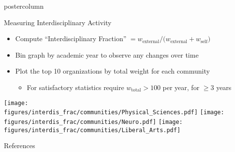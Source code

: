 \documentclass{beamer}
\newcommand{\includedir}{../latex_files}
\newcommand{\figures}{../outputs/plots}
\newlength{\columnheight}
\begin{document}
\begin{frame}
\begin{columns}
\begin{column}{.43\textwidth}
\begin{beamercolorbox}[center]{postercolumn}
\begin{minipage}{.98\textwidth}
\parbox[t][\columnheight]{\textwidth}{
  \begin{myblock}{Measuring Interdisciplinary Activity}
    \begin{itemize}
      \item Compute ``Interdisciplinary Fraction'' $= w_{\text{external}} / \big(w_{\text{external}} + w_{\text{self}}\big)$
      \item Bin graph by academic year to observe any changes over time
      \item Plot the top 10 organizations by total weight for each community
      \begin{itemize}
        \item For satisfactory statistics require $w_{\text{total}} > 100$ per year, for $\geq 3$ years
      \end{itemize}
    \end{itemize}
    \vspace{0.8cm}
    \begin{center}
      \texttt{[image: \\figures/interdis\_frac/communities/Physical\_Sciences.pdf]}
      \vspace{0.41cm}
      \texttt{[image: \\figures/interdis\_frac/communities/Neuro.pdf]}
      \vspace{0.41cm}
      \texttt{[image: \\figures/interdis\_frac/communities/Liberal\_Arts.pdf]}
    \end{center}
  \end{myblock}\vfill


  \nocite{networkx}

  \begin{myblock}{References}
    
    {\footnotesize
      
    }
  \end{myblock}\vfill

}\end{minipage}\end{beamercolorbox}
\end{column}

\end{columns}
\end{frame}
\end{document}
